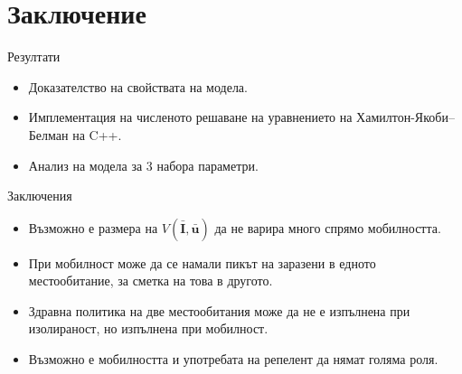 \section{\hspace{1em}Заключение}

\begin{frame}[t]{Резултати}
  \begin{itemize}
    \item Доказателство на свойствата на модела.
    \item Имплементация на численото решаване на уравнението на Хамилтон-Якоби–Белман на C++.
    \item Анализ на модела за 3 набора параметри.
  \end{itemize}
\end{frame}

\begin{frame}[t]{Заключения}
  \begin{itemize}
    \item Възможно е размера на $V(\bar{\boldsymbol{I}}, \bar{\boldsymbol{u}})$ да не варира много спрямо мобилността.
    \item При мобилност може да се намали пикът на заразени в едното местообитание, за сметка на това в другото.
    \item Здравна политика на две местообитания може да не е изпълнена при изолираност, но изпълнена при мобилност.
    \item Възможно е мобилността и употребата на репелент да нямат голяма роля.
  \end{itemize}
\end{frame}
